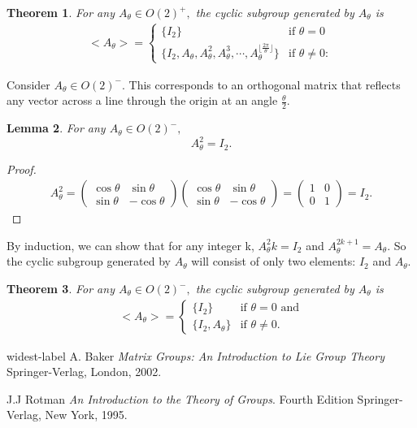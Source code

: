 \documentclass[a4 paper, 12pt]{article}
\newtheorem{theorem}{Theorem}
\newtheorem{lemma}[theorem]{Lemma}
\begin{document}
	\begin{theorem}
	For any $A_\theta \in O(2)^+,$ the cyclic subgroup generated by $A_\theta$ is
	\begin{align*}
	<A_\theta> =
	\begin{cases}
		\{I_2\} &\text{if $\theta = 0$}\\
		\{I_2, A_\theta, A_\theta^2, A_\theta^3, \cdots, A_\theta^{\lfloor\frac{2\pi}{\theta}\rfloor}\}
		&\text{if 	$\theta \not = 0:$}
	\end{cases}
	\end{align*}
	\end{theorem} 
	
	\vspace{5mm}
	Consider $A_\theta \in O(2)^-.$ This corresponds to an orthogonal matrix that reflects any vector across a line through the origin at an angle $\frac{\theta}{2}.$
	
	\begin{lemma}
		For any $A_{\theta} \in O(2)^-,$ $$A_\theta^2 = I_2.$$
	\end{lemma}
	\begin{proof}
		\begin{align*}
			A_\theta^2 =
			\begin{pmatrix}
				\cos \theta & \sin \theta \\
				\sin \theta & -\cos \theta
			\end{pmatrix}
			\begin{pmatrix}
				\cos \theta & \sin \theta \\
				\sin \theta & -\cos \theta
			\end{pmatrix}
			=
			\begin{pmatrix}
				1 & 0\\
				0& 1
			\end{pmatrix}
			= I_2.
		\end{align*}
	\end{proof}
	By induction, we can show that for any integer k, $A_{\theta}^2k = I_2$ and $A_{\theta} ^ {2k+1} = A_\theta.$ So the cyclic subgroup generated by $A_\theta$ will consist of only two elements: $I_2$ and $A_{\theta}.$
	
	\begin{theorem}
		For any $A_\theta \in O(2)^-,$ the cyclic subgroup generated by $A_\theta$ is 
		\begin{align*}
			<A_\theta> =
		\begin{cases}
		\{I_2\} & \text{if $\theta = 0$ and}\\
		\{I_2, A_\theta\} &\text{if $\theta \not = 0.$}
		\end{cases}
\end{align*}
	\end{theorem}
	
	\begin{thebibliography}{widest-label}
			A. Baker
			\newblock \emph{Matrix Groups: An Introduction to Lie Group Theory}
			\newblock Springer-Verlag, London, 2002.
			
			J.J Rotman
			\newblock \emph{An Introduction to the Theory of Groups}.
			Fourth Edition
			\newblock Springer-Verlag, New York, 1995.
			
			
	\end{thebibliography}
\end{document}
